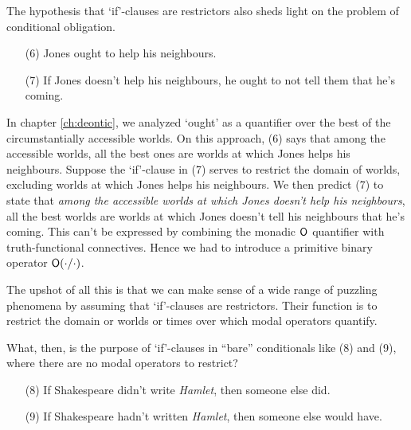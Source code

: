 
The hypothesis that `if'-clauses are restrictors also sheds light on the problem
of conditional obligation.
\begin{enumerate}[leftmargin=10mm]
  \itemsep-1mm  
  \item[(6)] Jones ought to help his neighbours.
  \item[(7)] If Jones doesn't help his neighbours, he ought to not tell them that he's coming.
\end{enumerate}
In chapter \ref{ch:deontic}, we analyzed `ought' as a quantifier over the best
of the circumstantially accessible worlds. On this approach, (6) says that among
the accessible worlds, all the best ones are worlds at which Jones helps his
neighbours. Suppose the `if'-clause in (7) serves to restrict the domain of
worlds, excluding worlds at which Jones helps his neighbours. We then predict
(7) to state that \emph{among the accessible worlds at which Jones doesn't help
  his neighbours}, all the best worlds are worlds at which Jones doesn't tell
his neighbours that he's coming. This can't be expressed by combining the
monadic $\operatorname{\mathsf{O}}$ quantifier with truth-functional connectives. Hence we had to
introduce a primitive binary operator $\operatorname{\mathsf{O}}(\cdot/\cdot)$.


The upshot of all this is that we can make sense of a wide range of puzzling
phenomena by assuming that `if'-clauses are restrictors. Their function is to
restrict the domain or worlds or times over which modal operators quantify.

What, then, is the purpose of `if'-clauses in ``bare'' conditionals like (8) and
(9), where there are no modal operators to restrict?
\begin{enumerate}[leftmargin=10mm]
  \itemsep-1mm
  \item[(8)] If Shakespeare didn't write \emph{Hamlet}, then someone else did.
  \item[(9)] If Shakespeare hadn't written \emph{Hamlet}, then someone else
        would have.
\end{enumerate}

